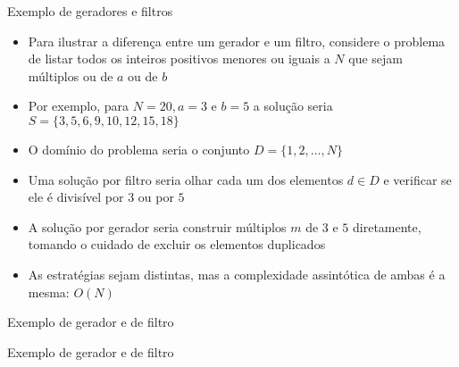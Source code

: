 \begin{frame}[fragile]{Exemplo de geradores e filtros}

    \begin{itemize}
        \item Para ilustrar a diferença entre um gerador e um filtro, considere o problema de
            listar todos os inteiros positivos menores ou iguais a $N$ que sejam múltiplos ou
            de $a$ ou de $b$

        \item Por exemplo, para $N = 20, a = 3$ e $b = 5$ a solução seria 
            $S = \lbrace 3, 5, 6, 9, 10, 12, 15, 18\rbrace$

        \item O domínio do problema seria o conjunto $D = \lbrace 1, 2, \ldots, N\rbrace$

        \item Uma solução por filtro seria olhar cada um dos elementos $d\in D$ e verificar se
            ele é divisível por $3$ ou por $5$

        \item A solução por gerador seria construir múltiplos $m$ de $3$ e $5$ diretamente, 
            tomando o cuidado de excluir os elementos duplicados

        \item As estratégias sejam distintas, mas a complexidade assintótica de ambas é a 
            mesma: $O(N)$
    \end{itemize}

\end{frame}

\begin{frame}[fragile]{Exemplo de gerador e de filtro}
\end{frame}

\begin{frame}[fragile]{Exemplo de gerador e de filtro}
\end{frame}
